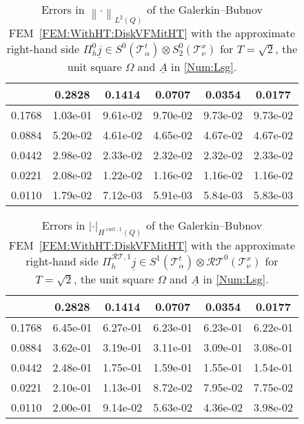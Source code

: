 \documentclass[a4paper,11pt]{article}
\newcommand{\cu}{\operatorname{curl}}
\renewcommand{\vec}[1]{\underline{#1}}
\newcommand{\abs}[1]{\left\lvert{#1}\right\rvert}
\newcommand{\norm}[1]{{\left\lVert{#1}\right\rVert}}
\begin{document}
\begin{table}[ht!]
	\begin{center}
		\begin{footnotesize}\begin{tabular}{r||c|c|c|c|c}
				\diagbox{$h_x$}{\vspace*{-.1cm}$h_t$} & 0.2828 & 0.1414 & 0.0707 & 0.0354 & 0.0177   \\
				\hline\hline
				0.1768 & 1.03e-01 & 9.61e-02 & 9.70e-02 & 9.73e-02 & 9.73e-02 \\
				0.0884 & 5.20e-02 & 4.61e-02 & 4.65e-02 & 4.67e-02 & 4.67e-02 \\
				0.0442 & 2.98e-02 & 2.33e-02 & 2.32e-02 & 2.32e-02 & 2.33e-02 \\
				0.0221 & 2.08e-02 & 1.22e-02 & 1.16e-02 & 1.16e-02 & 1.16e-02 \\
				0.0110 & 1.79e-02 & 7.12e-03 & 5.91e-03 & 5.84e-03 & 5.83e-03
		\end{tabular}\end{footnotesize}
		\caption{Errors in $\norm{\cdot}_{L^2(Q)}$ of the Galerkin--Bubnov FEM~\eqref{FEM:WithHT:DiskVFMitHT} with the approximate right-hand side $\Pi_h^0 \vec j \in S^0(\mathcal T^t_\alpha) \otimes S_2^0(\mathcal T^x_\nu)$ for $T=\sqrt{2}$, the unit square $\Omega$ and $\vec A$ in \eqref{Num:Lsg}.} \label{Num:Tab:MitConstL2}
	\end{center}
\end{table}

\begin{table}[ht!]
	\begin{center}
		\begin{footnotesize}\begin{tabular}{r||c|c|c|c|c}
				\diagbox{$h_x$}{\vspace*{-.1cm}$h_t$} & 0.2828 & 0.1414 & 0.0707 & 0.0354 & 0.0177   \\
				\hline\hline
				0.1768 & 6.45e-01 & 6.27e-01 & 6.23e-01 & 6.23e-01 & 6.22e-01 \\
				0.0884 & 3.62e-01 & 3.19e-01 & 3.11e-01 & 3.09e-01 & 3.08e-01 \\
				0.0442 & 2.48e-01 & 1.75e-01 & 1.59e-01 & 1.55e-01 & 1.54e-01 \\
				0.0221 & 2.10e-01 & 1.13e-01 & 8.72e-02 & 7.95e-02 & 7.75e-02 \\
				0.0110 & 2.00e-01 & 9.14e-02 & 5.63e-02 & 4.36e-02 & 3.98e-02
		\end{tabular}\end{footnotesize}
		\caption{Errors in $\abs{\cdot}_{H^{\cu;1}(Q)}$ of the Galerkin--Bubnov FEM~\eqref{FEM:WithHT:DiskVFMitHT} with the approximate right-hand side $\Pi_h^{\mathcal{RT},1} \vec j \in S^1(\mathcal T^t_\alpha) \otimes \mathcal{RT}^0(\mathcal T^x_\nu)$ for $T=\sqrt{2}$, the unit square $\Omega$ and $\vec A$ in \eqref{Num:Lsg}.} \label{Num:Tab:MitRTH1Curl}
	\end{center}
\end{table}
\end{document}
